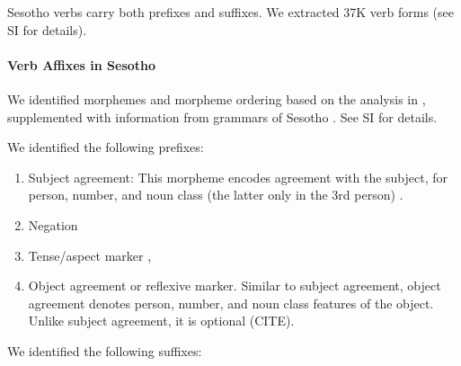 Sesotho verbs carry both prefixes and suffixes.
We extracted 37K verb forms (see SI for details).


\paragraph{Verb Affixes in Sesotho}

We identified morphemes and morpheme ordering based on the analysis in \cite{demuth1992acquisition}, supplemented with information from grammars of Sesotho \citep{doke1967textbook,guma1971outline}. See SI for details.


We identified the following prefixes:

\begin{enumerate}
    \item Subject agreement: This morpheme encodes agreement with the subject, for person, number, and noun class (the latter only in the 3rd person) \cite[]{doke1967textbook}.
    
    \item Negation 
    
    \item Tense/aspect marker  \cite[p. 165-166]{guma1971outline}, \cite[-424]{doke1967textbook}
    
    \item Object agreement or reflexive marker. 
    Similar to subject agreement, object agreement denotes person, number, and noun class features of the object.
    Unlike subject agreement, it is optional (CITE).
\end{enumerate}
We identified the following suffixes:
    

